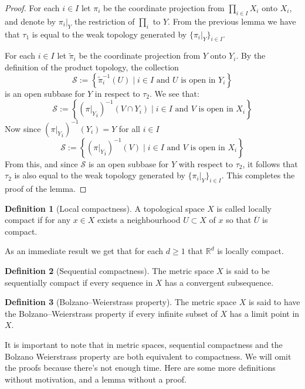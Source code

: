 \documentclass[11pt,a4paper]{article}
\theoremstyle{definition}
\newtheorem{definition}{Definition}[section]
\theoremstyle{plain}
\newcommand{\R}{\mathbb{R}}
\newcommand{\set}[2]{ \left\{ #1 \mid #2 \right\} }
\begin{document}
  \begin{proof}
    For each $i \in I$ let $\pi_i$ be the coordinate projection from 
    $\prod_{i \in I}{X_i}$ onto $X_i$, and denote by $\pi_i\vert_Y$ the 
    restriction of $\prod_i$ to $Y$. From the previous lemma we have
    that $\tau_1$ is equal to the weak topology generated by 
    $\{\pi_i \vert_Y\}_{i \in I}$. 
    
    For each $i \in I$ let $\tilde{\pi}_i$ be the coordinate projection from 
    $Y$ onto $Y_i$. By the definition of the product topology, the collection
    \[
      \mathcal{S} := \set{\tilde{\pi}_{i}^{-1}(U)}
      {\text{$i \in I$ and $U$ is open in $Y_i$}}
    \]
    is an open subbase for $Y$ in respect to $\tau_2$. We see that:
    \[
      \mathcal{S} := \set{({\pi \vert_Y}_{i})^{-1}(V \cap Y_i)}
      {\text{$i \in I$ and $V$ is open in $X_i$}}
    \]
    Now since $({\pi \vert_Y}_{i})^{-1}(Y_i) = Y$ for all $i \in I$
    \[
      \mathcal{S} := \set{({\pi \vert_Y}_{i})^{-1}(V)}
      {\text{$i \in I$ and $V$ is open in $X_i$}}
    \]
    From this, and since $\mathcal{S}$ is an open subbase for $Y$ with 
    respect to $\tau_2$, it follows that $\tau_2$ is also equal to the weak 
    topology generated by $\{\pi_i \vert_Y\}_{i \in I}$. This completes the
    proof of the lemma.
  \end{proof}

  \begin{definition}[Local compactness]
    A topological space $X$ is called locally compact if for
    any $x \in X$ exists a neighbourhood $U \subset X$ of $x$ so that
    $\overline{U}$ is compact.
  \end{definition}

  As an immediate result we get that for each $d \geq 1$ that $\R^d$
  is locally compact.
  
  \begin{definition}[Sequential compactness]
    The metric space $X$ is said to be sequentially compact
    if every sequence in $X$ has a convergent subsequence.
  \end{definition}

  \begin{definition}[Bolzano--Weierstrass property]
    The metric space $X$ is said to have the 
    Bolzano--Weierstrass property if every infinite subset of 
    $X$ has a limit point in $X$.
  \end{definition}

  It is important to note that in metric spaces, sequential compactness and 
  the Bolzano Weierstrass property are both
  equivalent to compactness. We will omit the proofs because there's not
  enough time. Here are some more definitions without
  motivation, and a lemma without a proof.
  
\end{document}
